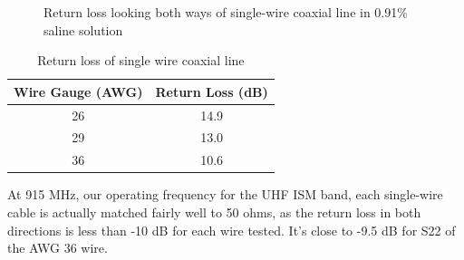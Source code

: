 \documentclass[12pt,onecolumn,titlepage]{article}
\begin{document}
\begin{figure}[htbp]
	\centering
		\quad
		\quad
	\label{fig:s11_s22_Saline}
	\caption{Return loss looking both ways of single-wire coaxial line in 0.91\% saline solution}
\end{figure}


\begin{table}[htbp]
\centering
	\caption{Return loss of single wire coaxial line}
	\begin{tabular}{| c | c |}
	\hline
	 Wire Gauge (AWG) & Return Loss (dB) \\ \hline
	 26 & 14.9 \\ \hline
	 29 & 13.0  \\ \hline
	 36 & 10.6  \\ \hline
	 \end{tabular}
\label{tab:power_loss}
\end{table}


At 915 MHz, our operating frequency for the UHF ISM band, each single-wire cable is actually matched fairly well to 50 ohms, as the return loss in both directions is less than -10 dB for each wire tested. It's close to -9.5 dB for S22 of the AWG 36 wire.
\end{document}
